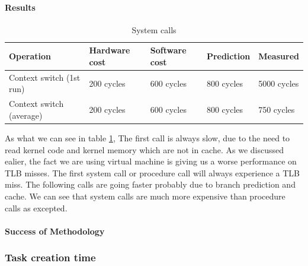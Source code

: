 \paragraph{Results}
\begin{table} [h]
\begin{center}
\begin{tabular}{| l | l | l | l | l |}
\hline
Operation & Hardware cost & Software cost & Prediction & Measured \\
\hline
Context switch (1st run) & 200 cycles & 600 cycles & 800 cycles & 5000 cycles\\
\hline
Context switch (average) & 200 cycles & 600 cycles & 800 cycles & 750 cycles\\
\hline
\end{tabular}
\end{center}

\caption{System calls\label {tab:sysCall}}
\end{table}

As what we can see in table \ref{tab:sysCall}, The first call is always slow, due to the need to read kernel code and
kernel memory which are not in cache. As we discussed ealier, the fact we are using virtual machine is giving us a worse performance on TLB misses. The first system call or procedure call will always experience a TLB miss.
The following calls are going faster probably due to branch prediction and
cache.
We can see that system calls are much more expensive than procedure calls as excepted.


\paragraph{Success of Methodology}


\subsubsection{Task creation time}
